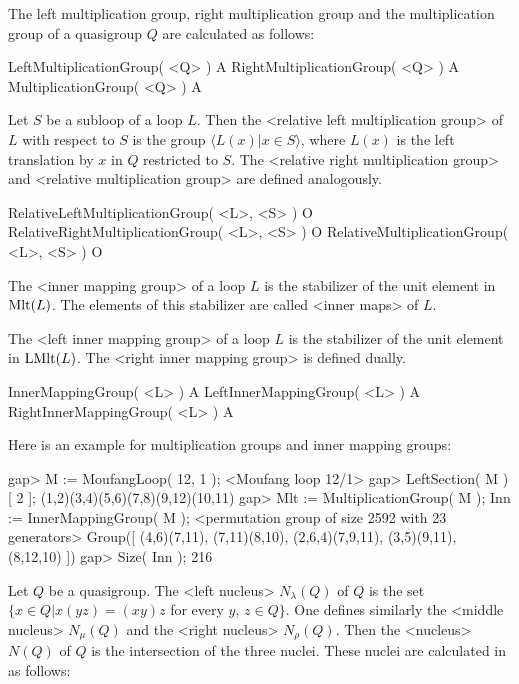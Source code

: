 The left multiplication group, right multiplication group and the
multiplication group of a quasigroup $Q$ are calculated as follows:

\>LeftMultiplicationGroup( <Q> ) A
\>RightMultiplicationGroup( <Q> ) A
\>MultiplicationGroup( <Q> ) A

Let $S$ be a subloop of a loop $L$. Then the <relative left multiplication group>
%
%
 of $L$ with respect to $S$ is the group $\langle L(x)|x\in S\rangle$, where
$L(x)$ is the left translation by $x$ in $Q$ restricted to $S$. The
<relative right multiplication group>
%
%
 and <relative multiplication group>
%
%
 are defined analogously.

\>RelativeLeftMultiplicationGroup( <L>, <S> ) O
\>RelativeRightMultiplicationGroup( <L>, <S> ) O
\>RelativeMultiplicationGroup( <L>, <S> ) O


The <inner mapping group>
%
%
 of a loop $L$ is the stabilizer of the
unit element in ${\rm{Mlt}}(L)$. The elements of this stabilizer are called
<inner maps> of $L$.

The <left inner mapping group>
%
%
 of a loop $L$ is the stabilizer of the unit
element in ${\rm{LMlt}}(L)$. The <right inner mapping group>
%
%
 is defined dually.

\>InnerMappingGroup( <L> ) A
\>LeftInnerMappingGroup( <L> ) A
\>RightInnerMappingGroup( <L> ) A

Here is an example for multiplication groups and inner mapping groups:

\beginexample
gap> M := MoufangLoop( 12, 1 );
<Moufang loop 12/1>
gap> LeftSection( M )[ 2 ];
(1,2)(3,4)(5,6)(7,8)(9,12)(10,11)
gap> Mlt := MultiplicationGroup( M ); Inn := InnerMappingGroup( M );
<permutation group of size 2592 with 23 generators>
Group([ (4,6)(7,11), (7,11)(8,10), (2,6,4)(7,9,11), (3,5)(9,11), (8,12,10) ])
gap> Size( Inn );
216
\endexample


Let $Q$ be a quasigroup. The <left nucleus>
%
%
 $N_\lambda(Q)$ of $Q$ is the
set $\{x\in Q| x(yz)=(xy)z$ for every $y$, $z\in Q\}$. One defines similarly
the <middle nucleus>
%
%
 $N_\mu(Q)$ and the <right nucleus>
%
%
 $N_\rho(Q)$.
Then the <nucleus>
%
%
 $N(Q)$ of $Q$ is the intersection of the three nuclei.
These nuclei are calculated in {\LOOPS} as follows:

